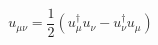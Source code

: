 \begin{equation}
u_{\mu\nu} = \frac{1}{2} (u_{\mu}^{\dagger} u_{\nu} - u_{\nu}^{\dagger} u_{\mu})
\end{equation}

